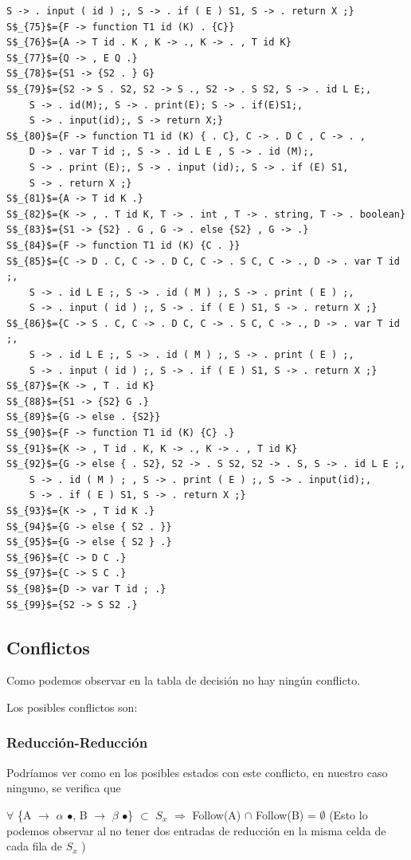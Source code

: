 \documentclass[a4paper, 12pt]{article}
\begin{document}
\begin{lstlisting}[basicstyle=\footnotesize]
	S -> . input ( id ) ;, S -> . if ( E ) S1, S -> . return X ;}
S$_{75}$={F -> function T1 id (K) . {C}}
S$_{76}$={A -> T id . K , K -> ., K -> . , T id K}
S$_{77}$={Q -> , E Q .}
S$_{78}$={S1 -> {S2 . } G}
S$_{79}$={S2 -> S . S2, S2 -> S ., S2 -> . S S2, S -> . id L E;,
	S -> . id(M);, S -> . print(E); S -> . if(E)S1;,
	S -> . input(id);, S -> return X;}
S$_{80}$={F -> function T1 id (K) { . C}, C -> . D C , C -> . ,
	D -> . var T id ;, S -> . id L E , S -> . id (M);,
	S -> . print (E);, S -> . input (id);, S -> . if (E) S1,
	S -> . return X ;}
S$_{81}$={A -> T id K .}
S$_{82}$={K -> , . T id K, T -> . int , T -> . string, T -> . boolean}
S$_{83}$={S1 -> {S2} . G , G -> . else {S2} , G -> .}
S$_{84}$={F -> function T1 id (K) {C . }}
S$_{85}$={C -> D . C, C -> . D C, C -> . S C, C -> ., D -> . var T id ;,
	S -> . id L E ;, S -> . id ( M ) ;, S -> . print ( E ) ;,
	S -> . input ( id ) ;, S -> . if ( E ) S1, S -> . return X ;}
S$_{86}$={C -> S . C, C -> . D C, C -> . S C, C -> ., D -> . var T id ;,
	S -> . id L E ;, S -> . id ( M ) ;, S -> . print ( E ) ;,
	S -> . input ( id ) ;, S -> . if ( E ) S1, S -> . return X ;}
S$_{87}$={K -> , T . id K}
S$_{88}$={S1 -> {S2} G .}
S$_{89}$={G -> else . {S2}}
S$_{90}$={F -> function T1 id (K) {C} .}
S$_{91}$={K -> , T id . K, K -> ., K -> . , T id K}
S$_{92}$={G -> else { . S2}, S2 -> . S S2, S2 -> . S, S -> . id L E ;,
	S -> . id ( M ) ; , S -> . print ( E ) ;, S -> . input(id);,
	S -> . if ( E ) S1, S -> . return X ;}
S$_{93}$={K -> , T id K .}  
S$_{94}$={G -> else { S2 . }}
S$_{95}$={G -> else { S2 } .}
S$_{96}$={C -> D C .}
S$_{97}$={C -> S C .}
S$_{98}$={D -> var T id ; .}
S$_{99}$={S2 -> S S2 .}
\end{lstlisting}

\subsection{Conflictos}
Como podemos observar en la tabla de decisión no hay ningún conflicto.

Los posibles conflictos son:
	\subsubsection*{Reducción-Reducción}
	Podríamos ver como en los posibles estados con este conflicto, en nuestro caso ninguno, se verifica que 
	
	$\forall$ \{A $\rightarrow$ $\alpha$ $\bullet$, B $\rightarrow$ $\beta$ $\bullet$\} $\subset$ $S_x$ $\Rightarrow$ Follow(A) $\cap$ Follow(B) = $\emptyset$ (Esto lo podemos observar al no tener dos entradas de reducción en la misma celda de cada fila de $S_x$ )
	
\end{document}
